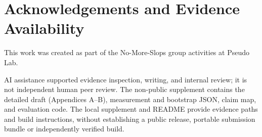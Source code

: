 \documentclass[10pt,twocolumn,letterpaper]{article}
\begin{document}
\section{Acknowledgements and Evidence
Availability}\label{acknowledgements-and-evidence-availability}

This work was created as part of the No-More-Slops group activities at
Pseudo Lab.

AI assistance supported evidence inspection, writing, and internal
review; it is not independent human peer review. The non-public
supplement contains the detailed draft (Appendices A--B), measurement
and bootstrap JSON, claim map, and evaluation code. The local supplement
and README provide evidence paths and build instructions, without
establishing a public release, portable submission bundle or
independently verified build.

\label{main-text-end}
\clearpage
\nobalance


\end{document}
